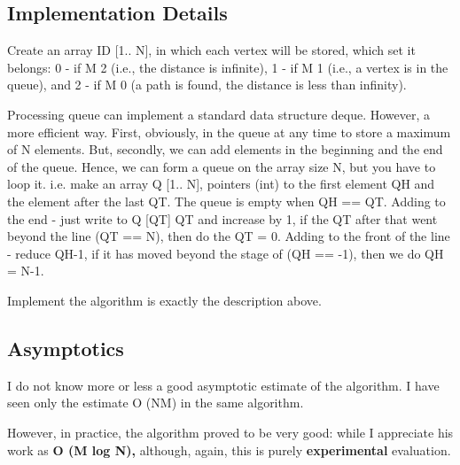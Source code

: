 \subsection{ Implementation Details }
Create an array ID [1.. N], in which each vertex will be stored, which set it belongs: 0 - if M 2 (i.e., the distance is infinite), 1 - if M 1 (i.e., a vertex is in the queue), and 2 - if M 0 (a path is found, the distance is less than infinity).

Processing queue can implement a standard data structure deque. However, a more efficient way. First, obviously, in the queue at any time to store a maximum of N elements. But, secondly, we can add elements in the beginning and the end of the queue. Hence, we can form a queue on the array size N, but you have to loop it. i.e. make an array Q [1.. N], pointers (int) to the first element QH and the element after the last QT. The queue is empty when QH == QT. Adding to the end - just write to Q [QT] QT and increase by 1, if the QT after that went beyond the line (QT == N), then do the QT = 0. Adding to the front of the line - reduce QH-1, if it has moved beyond the stage of (QH == -1), then we do QH = N-1.

Implement the algorithm is exactly the description above.

\subsection{ Asymptotics }
I do not know more or less a good asymptotic estimate of the algorithm. I have seen only the estimate O (NM) in the same algorithm.

However, in practice, the algorithm proved to be very good: while I appreciate his work as \textbf{O (M log N),} although, again, this is purely \textbf{experimental} evaluation.

